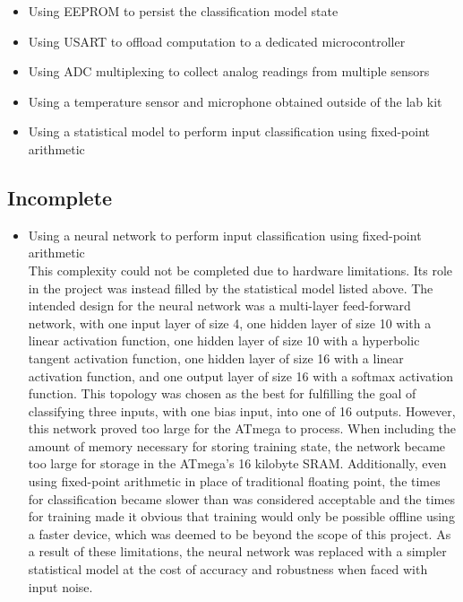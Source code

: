 \documentclass{article}
\begin{document}
\begin{itemize}

  \item Using EEPROM to persist the classification model state

  \item Using USART to offload computation to a dedicated
    microcontroller

  \item Using ADC multiplexing to collect analog readings from multiple
    sensors

  \item Using a temperature sensor and microphone obtained outside of
    the lab kit

  \item Using a statistical model to perform input classification using
    fixed-point arithmetic

\end{itemize}

\subsection{Incomplete}

\begin{itemize}

  \item Using a neural network to perform input classification using
    fixed-point arithmetic \\
    This complexity could not be completed due to hardware limitations.
    Its role in the project was instead filled by the statistical model
    listed above.  The intended design for the neural network was a
    multi-layer feed-forward network, with one input layer of size 4,
    one hidden layer of size 10 with a linear activation function, one
    hidden layer of size 10 with a hyperbolic tangent activation
    function, one hidden layer of size 16 with a linear activation
    function, and one output layer of size 16 with a softmax activation
    function.  This topology was chosen as the best for fulfilling the
    goal of classifying three inputs, with one bias input, into one of
    16 outputs.  However, this network proved too large for the ATmega
    to process.  When including the amount of memory necessary for
    storing training state, the network became too large for storage in
    the ATmega's 16 kilobyte SRAM.  Additionally, even using fixed-point
    arithmetic in place of traditional floating point, the times for
    classification became slower than was considered acceptable and the
    times for training made it obvious that training would only be
    possible offline using a faster device, which was deemed to be
    beyond the scope of this project.  As a result of these limitations,
    the neural network was replaced with a simpler statistical model at
    the cost of accuracy and robustness when faced with input noise.

\end{itemize}
\end{document}
